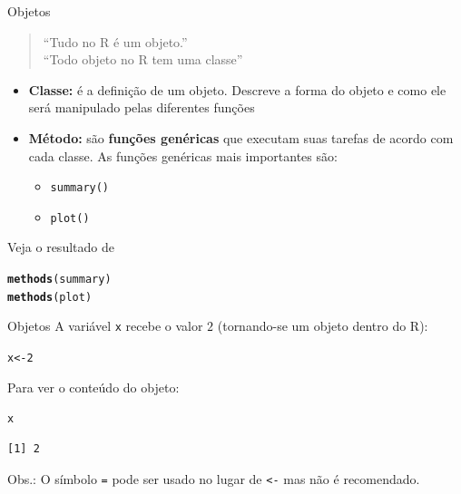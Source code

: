 \documentclass[10pt,handout]{beamer}\usepackage[]{graphicx}\usepackage[]{color}
\makeatletter
\newcommand{\hlnum}[1]{\textcolor[rgb]{0.686,0.059,0.569}{#1}}%
\newcommand{\hlstd}[1]{\textcolor[rgb]{0.345,0.345,0.345}{#1}}%
\newcommand{\hlkwb}[1]{\textcolor[rgb]{0.69,0.353,0.396}{#1}}%
\newcommand{\hlkwd}[1]{\textcolor[rgb]{0.282,0.239,0.545}{\textbf{#1}}}%
\newenvironment{kframe}{%
 \def\at@end@of@kframe{}%
 \ifinner\ifhmode%
  \def\at@end@of@kframe{\end{minipage}}%
  \begin{minipage}{\columnwidth}%
 \fi\fi%
 \def\FrameCommand##1{\hskip\@totalleftmargin \hskip-\fboxsep
 \colorbox{shadecolor}{##1}\hskip-\fboxsep
     \hskip-\linewidth \hskip-\@totalleftmargin \hskip\columnwidth}%
 \MakeFramed {\advance\hsize-\width
   \@totalleftmargin\z@ \linewidth\hsize
   \@setminipage}}%
 {\par\unskip\endMakeFramed%
 \at@end@of@kframe}
\newenvironment{knitrout}{}{} %
\makeatother
\begin{document}
\begin{frame}[fragile]{Objetos}
\begin{quote}
    ``Tudo no R é um objeto.''\\
    ``Todo objeto no R tem uma classe''
\end{quote}
\begin{itemize}
\item \textbf{Classe:} é a definição de um objeto. Descreve a forma do
  objeto e como ele será manipulado pelas diferentes funções
\item \textbf{Método:} são \textbf{funções genéricas} que executam suas
  tarefas de acordo com cada classe. As funções genéricas mais
  importantes são:
  \begin{itemize}
  \item \verb|summary()|
  \item \verb|plot()|
  \end{itemize}
\end{itemize}
Veja o resultado de
\begin{knitrout}\small
{}\color{fgcolor}\begin{kframe}
\begin{alltt}
\hlkwd{methods}\hlstd{(summary)}
\hlkwd{methods}\hlstd{(plot)}
\end{alltt}
\end{kframe}
\end{knitrout}

\end{frame}

\begin{frame}[fragile]{Objetos}
A variável \texttt{x} recebe o valor $2$ (tornando-se um objeto dentro do R):
\begin{knitrout}\small
{}\color{fgcolor}\begin{kframe}
\begin{alltt}
\hlstd{x} \hlkwb{<-} \hlnum{2}
\end{alltt}
\end{kframe}
\end{knitrout}

\begin{center}
\end{center}
Para ver o conteúdo do objeto:
\begin{knitrout}\small
{}\color{fgcolor}\begin{kframe}
\begin{alltt}
\hlstd{x}
\end{alltt}
\begin{verbatim}
[1] 2
\end{verbatim}
\end{kframe}
\end{knitrout}

Obs.: O símbolo \verb|=| pode ser usado no lugar de \verb|<-| mas não é
recomendado.
\end{frame}
\end{document}
